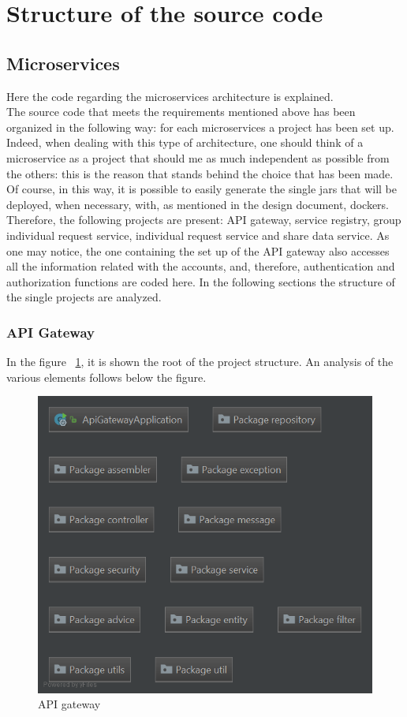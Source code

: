 \section{Structure of the source code}

\subsection{Microservices}
Here the code regarding the microservices architecture is explained. \\
The source code that meets the requirements mentioned above has been organized in the following way: for each microservices a project
has been set up. 
Indeed, when dealing with this type of architecture, one should think of a microservice
as a project that should me as much independent as possible from the others: this is the reason that stands behind the choice that has been
made. 
Of course, in this way, it is possible to easily generate the single jars that will be deployed, when necessary, with, as mentioned
in the design document, dockers. Therefore, the following projects are present: API gateway, service registry, group individual request
service, individual request service and share data service. 
As one may notice, the one containing the set up of the API gateway also accesses all the information related with the accounts, and, therefore, authentication and authorization functions are coded here.
In the following sections the structure of the single projects are analyzed. 

\subsubsection{API Gateway}
In the figure ~\ref{fig:pkgapigateway}, it is shown the root of the project structure. An analysis 
of the various elements follows below the figure. 
\begin{figure}[H]
\includegraphics[width=\linewidth]{images/PackageApigateway.png}
\caption{ API gateway }
\label{fig:pkgapigateway}
\end{figure}

